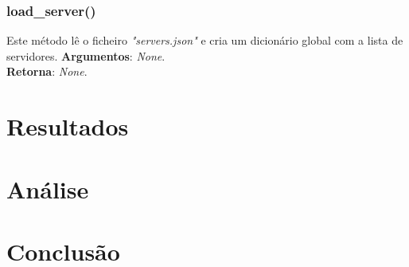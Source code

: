 \documentclass{report}
\begin{document}
\subsection{load\_server()}
Este método lê o ficheiro \textit{"servers.json"} e cria um dicionário global com a lista de servidores.
\textbf{Argumentos}:
\textit{None}.\\
\textbf{Retorna}: \textit{None}.





\chapter{Resultados}
\label{chap:resultados}
\chapter{Análise}
\label{chap:analise}
\chapter{Conclusão}
\label{chap:conclusao}



\end{document}
